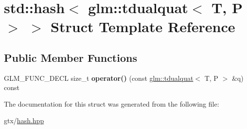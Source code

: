 \hypertarget{structstd_1_1hash_3_01glm_1_1tdualquat_3_01T_00_01P_01_4_01_4}{\section{std\-:\-:hash$<$ glm\-:\-:tdualquat$<$ T, P $>$ $>$ Struct Template Reference}
\label{structstd_1_1hash_3_01glm_1_1tdualquat_3_01T_00_01P_01_4_01_4}
}
\subsection*{Public Member Functions}
\begin{DoxyCompactItemize}
\item 
\hypertarget{structstd_1_1hash_3_01glm_1_1tdualquat_3_01T_00_01P_01_4_01_4_af5267e2cc75cabef2c00fca329c4ba72}{G\-L\-M\-\_\-\-F\-U\-N\-C\-\_\-\-D\-E\-C\-L size\-\_\-t {\bfseries operator()} (const \hyperlink{structglm_1_1tdualquat}{glm\-::tdualquat}$<$ T, P $>$ \&q) const }\label{structstd_1_1hash_3_01glm_1_1tdualquat_3_01T_00_01P_01_4_01_4_af5267e2cc75cabef2c00fca329c4ba72}

\end{DoxyCompactItemize}


The documentation for this struct was generated from the following file\-:\begin{DoxyCompactItemize}
\item 
gtx/\hyperlink{hash_8hpp}{hash.\-hpp}\end{DoxyCompactItemize}

